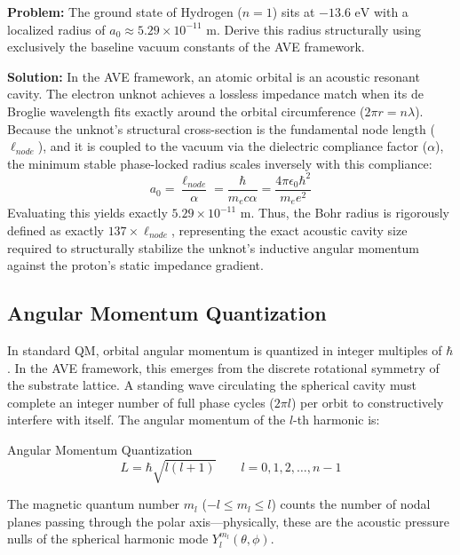 \begin{examplebox}
\textbf{Problem:} The ground state of Hydrogen ($n=1$) sits at $-13.6\text{ eV}$ with a localized radius of $a_0 \approx 5.29 \times 10^{-11}\text{ m}$. Derive this radius structurally using exclusively the baseline vacuum constants of the AVE framework.

\textbf{Solution:} In the AVE framework, an atomic orbital is an acoustic resonant cavity. The electron unknot achieves a lossless impedance match when its de Broglie wavelength fits exactly around the orbital circumference ($2\pi r = n\lambda$). 
Because the unknot's structural cross-section is the fundamental node length ($\ell_{node}$), and it is coupled to the vacuum via the dielectric compliance factor ($\alpha$), the minimum stable phase-locked radius scales inversely with this compliance:
\[ a_0 = \frac{\ell_{node}}{\alpha} = \frac{\hbar}{m_e c \alpha} = \frac{4\pi\epsilon_0 \hbar^2}{m_e e^2} \]
Evaluating this yields exactly $5.29 \times 10^{-11}\text{ m}$. Thus, the Bohr radius is rigorously defined as exactly $137 \times \ell_{node}$, representing the exact acoustic cavity size required to structurally stabilize the unknot's inductive angular momentum against the proton's static impedance gradient.
\end{examplebox}

\subsection{Angular Momentum Quantization}
In standard QM, orbital angular momentum is quantized in integer multiples of $\hbar$. In the AVE framework, this emerges from the discrete rotational symmetry of the substrate lattice. A standing wave circulating the spherical cavity must complete an integer number of full phase cycles ($2\pi l$) per orbit to constructively interfere with itself. The angular momentum of the $l$-th harmonic is:
\begin{resultbox}{Angular Momentum Quantization}
\begin{equation}
    L = \hbar\sqrt{l(l+1)} \qquad l = 0, 1, 2, \ldots, n-1
\end{equation}
\end{resultbox}

The magnetic quantum number $m_l$ ($-l \leq m_l \leq l$) counts the number of nodal planes passing through the polar axis---physically, these are the acoustic pressure nulls of the spherical harmonic mode $Y_l^{m_l}(\theta, \phi)$.

